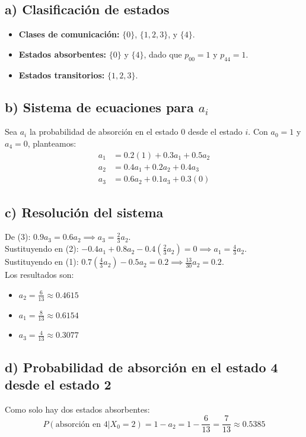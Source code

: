 \documentclass[letterpaper, 12pt]{article}
\begin{document}
    \subsection*{a) Clasificación de estados}
    \begin{itemize}
        \item \textbf{Clases de comunicación:} $\{0\}$, $\{1, 2, 3\}$, y $\{4\}$.
        \item \textbf{Estados absorbentes:} $\{0\}$ y $\{4\}$, dado que $p_{00}=1$ y $p_{44}=1$.
        \item \textbf{Estados transitorios:} $\{1, 2, 3\}$.
    \end{itemize}

    \subsection*{b) Sistema de ecuaciones para $a_i$}
    Sea $a_i$ la probabilidad de absorción en el estado 0 desde el estado $i$. Con $a_0 = 1$ y $a_4 = 0$, planteamos:
    \begin{align}
        a_1 &= 0.2(1) + 0.3a_1 + 0.5a_2 \\
        a_2 &= 0.4a_1 + 0.2a_2 + 0.4a_3 \\
        a_3 &= 0.6a_2 + 0.1a_3 + 0.3(0)
    \end{align}

    \subsection*{c) Resolución del sistema}
    De (3): $0.9a_3 = 0.6a_2 \implies a_3 = \frac{2}{3}a_2$. \\
    Sustituyendo en (2): $-0.4a_1 + 0.8a_2 - 0.4(\frac{2}{3}a_2) = 0 \implies a_1 = \frac{4}{3}a_2$. \\
    Sustituyendo en (1): $0.7(\frac{4}{3}a_2) - 0.5a_2 = 0.2 \implies \frac{13}{30}a_2 = 0.2$. \\
    Los resultados son:
    \begin{itemize}
        \item $a_2 = \frac{6}{13} \approx 0.4615$
        \item $a_1 = \frac{8}{13} \approx 0.6154$
        \item $a_3 = \frac{4}{13} \approx 0.3077$
    \end{itemize}

    \subsection*{d) Probabilidad de absorción en el estado 4 desde el estado 2}
    Como solo hay dos estados absorbentes:
    \[ P(\text{absorción en 4} | X_0=2) = 1 - a_2 = 1 - \frac{6}{13} = \frac{7}{13} \approx 0.5385 \text{} \]
\end{document}
